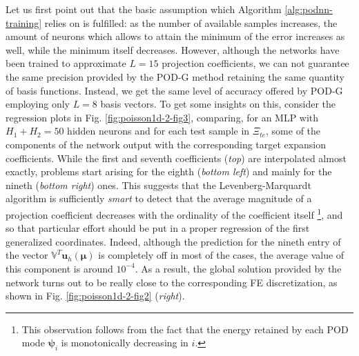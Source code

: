 \documentclass[12pt, a4paper, twoside, openright, notitlepage]{report}
\numberwithin{equation}{chapter}
\theoremstyle{theorem}
\theoremstyle{definition}
\theoremstyle{remark}
\theoremstyle{proposition}
\numberwithin{figure}{chapter}
\newcommand{\bg}[1]{\boldsymbol{#1}}
\begin{document}
		Let us first point out that the basic assumption which Algorithm \ref{alg:podnn-training} relies on is fulfilled: as the number of available samples increases, the amount of neurons which allows to attain the minimum of the error increases as well, while the minimum itself decreases. However, although the networks have been trained to approximate $L = 15$ projection coefficients, we can not guarantee the same precision provided by the POD-G method retaining the same quantity of basis functions. Instead, we get the same level of accuracy offered by POD-G employing only $L = 8$ basis vectors. To get some insights on this, consider the regression plots in Fig. \ref{fig:poisson1d-2-fig3}, comparing, for an MLP with $H_1 + H_2 = 50$ hidden neurons and for each test sample in $\Xi_{te}$, some of the components of the network output with the corresponding target expansion coefficients. While the first and seventh coefficients (\emph{top}) are interpolated almost exactly, problems start arising for the eighth (\emph{bottom left}) and mainly for the nineth (\emph{bottom right}) ones. This suggests that the Levenberg-Marquardt algorithm is sufficiently \emph{smart} to detect that the average magnitude of a projection coefficient decreases with the ordinality of the coefficient itself \footnote{This observation follows from the fact that the energy retained by each POD mode $\bg{\psi}_i$ is monotonically decreasing in $i$.}, and so that particular effort should be put in a proper regression of the first generalized coordinates. Indeed, although the prediction for the nineth entry of the vector $\mathbb{V}^T \mathbf{u}_h(\bg{\mu})$ is completely off in most of the cases, the average value of this component is around $10^{-4}$. As a result, the global solution provided by the network turns out to be really close to the corresponding FE discretization, as shown in Fig. \ref{fig:poisson1d-2-fig2} (\emph{right}).
		
		\clearpage
				
\end{document}
